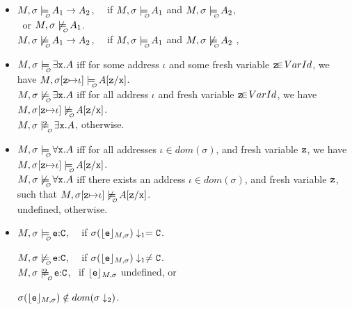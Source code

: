 \begin{definition}
\begin{itemize}
      \item
$\M,\sigma  \modelsWithO \syntax{\A_1} \rightarrow \syntax{\A_2}$, \ \  if   $\M,\sigma  \modelsWithO \syntax{\A_1}$ and  $\M,\sigma  \modelsWithO \syntax{\A_2}$,\\
$~$ \hspace{1in} or $\M,\sigma  \not\modelsWithO \syntax{\A_1}$.
 \\
  $\M,\sigma  \not\modelsWithO \syntax{\A_1} \rightarrow \syntax{\A_2}$, \ \  if   $\M,\sigma  \modelsWithO \syntax{\A_1}$ and  $\M,\sigma  \not\modelsWithO \syntax{\A_2}$ ,
 \\


 \item
  $\M,\sigma  \modelsWithO \exists \prg{x}.\syntax{\A}$ iff for some address $\iota$ and some {fresh} variable ${\textrm{\ttfamily{z}}}{\!\in\!{VarId}}$,  we have $\M,\sigma[\prg{z}{\mapsto}\iota] \modelsWithO  \syntax{\A[\prg{z}/\prg{x}}]$.
  \\
{$\M,\sigma \not\modelsWithO \exists \prg{x}.\syntax{\A}$ iff for all address $\iota$ and  {fresh} variable  ${\textrm{\ttfamily{z}}}{\!\in\!{VarId}}$,  we have $\M,\sigma[\prg{z}{\mapsto}\iota] \not\modelsWithO  \syntax{\A[\prg{z}/\prg{x}}]$.}
\\
$\M,\sigma  \modelsWithOQ \exists \prg{x}.\syntax{\A}$, otherwise.

  \item
  $\M,\sigma  \modelsWithO \forall \prg{x}.\syntax{\A}$ iff for all addresses $\iota\!\in dom\!(\sigma)$, and fresh variable ${\textrm{\ttfamily{z}}}$, we have  $\M,\sigma[\prg{z}{\mapsto}\iota] \modelsWithO  \syntax{\A[\prg{z}/\prg{x}}]$.
  \\
{  $\M,\sigma  \not\modelsWithO \forall \prg{x}.\syntax{\A}$ iff there exists an address  $\iota\!\in dom\!(\sigma)$, and fresh variable ${\textrm{\ttfamily{z}}}$, such that  $\M,\sigma[\prg{z}{\mapsto}\iota] \not\modelsWithO  \syntax{\A[\prg{z}/\prg{x}}]$.
  \\
  undefined, otherwise.}

  \item
 $\M,\sigma  \modelsWithO  \syntax{\sE}\kw{:}\prg{C}$, \ \  if $\sigma({\lfloor{ { {{{\ensuremath{\textrm{\ttfamily{e}}}}}}}}\rfloor_{M,\sigma}})\downarrow_1 = {\textrm{\ttfamily{C}}}$.
 \\
 {
 $\M,\sigma  \not\modelsWithO  \syntax{\sE}\kw{:}\prg{C}$, \ \  if $\sigma({\lfloor{ { {{{\ensuremath{\textrm{\ttfamily{e}}}}}}}}\rfloor_{M,\sigma}})\downarrow_1 \neq {\ensuremath{\textrm{\ttfamily{C}}}}$.
 \\
 $\M,\sigma \modelsWithOQ  \syntax{\sE}\kw{:}\prg{C}$, \  if ${\lfloor{ { {{{\ensuremath{\textrm{\ttfamily{e}}}}}}}}\rfloor_{M,\sigma}}$ undefined, or\\
\strut \hspace{1in} $\sigma({\lfloor{ { {{{\ensuremath{\textrm{\ttfamily{e}}}}}}}}\rfloor_{M,\sigma}})\notin dom(\sigma\downarrow_2)$.}


\end{itemize}
\end{definition}
